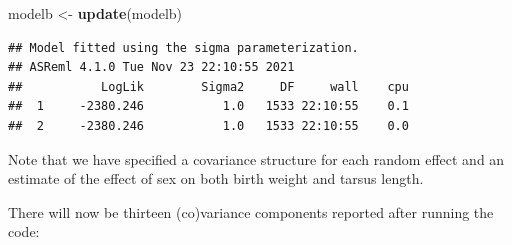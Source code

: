 \documentclass[
  12pt,
]{book}
\newenvironment{Shaded}{\begin{snugshade}}{\end{snugshade}}
\newcommand{\KeywordTok}[1]{\textcolor[rgb]{0.13,0.29,0.53}{\textbf{#1}}}
\newcommand{\NormalTok}[1]{#1}
\newcommand{\OperatorTok}[1]{\textcolor[rgb]{0.81,0.36,0.00}{\textbf{#1}}}
\newcommand{\StringTok}[1]{\textcolor[rgb]{0.31,0.60,0.02}{#1}}
\begin{document}
\begin{Shaded}
\begin{Highlighting}[]
\NormalTok{modelb \textless{}{-}}\StringTok{ }\KeywordTok{update}\NormalTok{(modelb)}
\end{Highlighting}
\end{Shaded}

\begin{verbatim}
## Model fitted using the sigma parameterization.
## ASReml 4.1.0 Tue Nov 23 22:10:55 2021
##           LogLik        Sigma2     DF     wall    cpu
##  1     -2380.246           1.0   1533 22:10:55    0.1
##  2     -2380.246           1.0   1533 22:10:55    0.0
\end{verbatim}

Note that we have specified a covariance structure for each random effect and an estimate of the effect of sex on both birth weight and tarsus length.

There will now be thirteen (co)variance components reported after running the code:

\begin{Shaded}
\end{Shaded}
\end{document}
